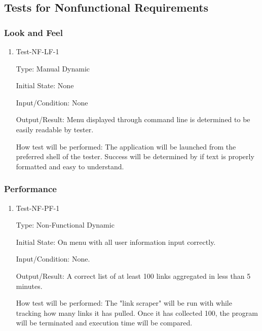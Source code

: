\documentclass[12pt, titlepage]{article}
\makeatletter
\def\itemlabel#1#2{\def\@currentlabel{#2}\phantomsection\label{#1}}
\makeatother
\begin{document}

\subsection{Tests for Nonfunctional Requirements}

\subsubsection{Look and Feel} 

\itemlabel{para:NFLF}{Test-NF-LF-1}

\begin{enumerate}

\item{Test-NF-LF-1\\}

Type: Manual Dynamic
					
Initial State: None
					
Input/Condition: None
					
Output/Result: Menu displayed through command line is determined to be easily readable by tester. 
					
How test will be performed: The application will be launched from the preferred shell of the tester. Success will be determined by if text is properly formatted and easy to understand. 

\end{enumerate}

\subsubsection{Performance}

\itemlabel{para:NFPF}{Test-NF-PF-1}

\begin{enumerate}

\item{Test-NF-PF-1\\}

Type: Non-Functional Dynamic
					
Initial State: On menu with all user information input correctly. 
					
Input/Condition: None. 
					
Output/Result: A correct list of at least 100 links aggregated in less than 5 minutes.  
					
How test will be performed: The "link scraper" will be run with while tracking how many links it has pulled. Once it has collected 100, the program will be terminated and execution time will be compared.  

\end{enumerate}
\end{document}
